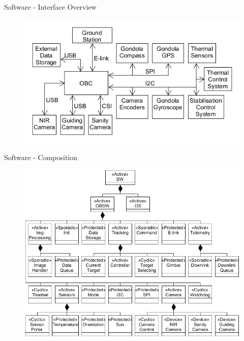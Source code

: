 \documentclass[11pt, aspectratio=169]{beamer}
\begin{document}

\begin{frame}[c]{Software - Interface Overview}
    \begin{figure}
        \includegraphics[height=\textheight]{software/process-overview.png}
    \end{figure}
\end{frame}

\begin{frame}[c]{Software - Composition}
    \begin{figure}
        \includegraphics[height=.9\textheight]{software/composition-tree.png}
    \end{figure}
\end{frame}
\end{document}
